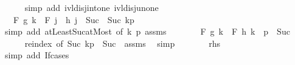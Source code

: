 \begin{isabellebody}
\ \ \ \ \isamarkupfalse%
\ {\isacharparenleft}{\kern0pt}simp\ add{\isacharcolon}{\kern0pt}\ ivl{\isacharunderscore}{\kern0pt}disj{\isacharunderscore}{\kern0pt}int{\isacharunderscore}{\kern0pt}one\ ivl{\isacharunderscore}{\kern0pt}disj{\isacharunderscore}{\kern0pt}un{\isacharunderscore}{\kern0pt}one{\isacharparenright}{\kern0pt}\isanewline
\ \ \isamarkupfalse%
\ \isamarkupfalse%
\ {\isachardoublequoteopen}{\isasymdots}\ {\isacharequal}{\kern0pt}\ F\ g\ {\isacharbraceleft}{\kern0pt}{\isachardot}{\kern0pt}{\isachardot}{\kern0pt}{\isacharless}{\kern0pt}k{\isacharbraceright}{\kern0pt}\ \isactrlbold {\isacharasterisk}{\kern0pt}\ F\ {\isacharparenleft}{\kern0pt}{\isasymlambda}j{\isachardot}{\kern0pt}\ \ h\ {\isacharparenleft}{\kern0pt}j\ {\isacharminus}{\kern0pt}\ Suc\ {}{\isacharparenright}{\kern0pt}{\isacharparenright}{\kern0pt}\ {\isacharbraceleft}{\kern0pt}Suc\ k{\isachardot}{\kern0pt}{\isachardot}{\kern0pt}p{\isacharbraceright}{\kern0pt}{\isachardoublequoteclose}\isanewline
\ \ \ \ \isamarkupfalse%
\ {\isacharparenleft}{\kern0pt}simp\ add{\isacharcolon}{\kern0pt}\ atLeast{\isacharunderscore}{\kern0pt}Suc{\isacharunderscore}{\kern0pt}atMost\ {\isacharbrackleft}{\kern0pt}of\ k\ p{\isacharbrackright}{\kern0pt}\ assms{\isacharparenright}{\kern0pt}\isanewline
\ \ \isamarkupfalse%
\ \isamarkupfalse%
\ {\isachardoublequoteopen}{\isasymdots}\ {\isacharequal}{\kern0pt}\ F\ g\ {\isacharbraceleft}{\kern0pt}{\isachardot}{\kern0pt}{\isachardot}{\kern0pt}{\isacharless}{\kern0pt}k{\isacharbraceright}{\kern0pt}\ \isactrlbold {\isacharasterisk}{\kern0pt}\ F\ h\ {\isacharbraceleft}{\kern0pt}k\ {\isachardot}{\kern0pt}{\isachardot}{\kern0pt}\ p\ {\isacharminus}{\kern0pt}\ Suc\ {}{\isacharbraceright}{\kern0pt}{\isachardoublequoteclose}\isanewline
\ \ \ \ \isamarkupfalse%
\ reindex\ {\isacharbrackleft}{\kern0pt}of\ Suc\ {\isachardoublequoteopen}{\isacharbraceleft}{\kern0pt}k{\isachardot}{\kern0pt}{\isachardot}{\kern0pt}p\ {\isacharminus}{\kern0pt}\ Suc\ {}{\isacharbraceright}{\kern0pt}{\isachardoublequoteclose}{\isacharbrackright}{\kern0pt}\ assms\ \isamarkupfalse%
\ simp\isanewline
\ \ \isamarkupfalse%
\ \isamarkupfalse%
\ {\isachardoublequoteopen}{\isasymdots}\ {\isacharequal}{\kern0pt}\ {\isacharquery}{\kern0pt}rhs{\isachardoublequoteclose}\isanewline
\ \ \ \ \isamarkupfalse%
\ {\isacharparenleft}{\kern0pt}simp\ add{\isacharcolon}{\kern0pt}\ If{\isacharunderscore}{\kern0pt}cases{\isacharparenright}{\kern0pt}\isanewline

\end{isabellebody}
